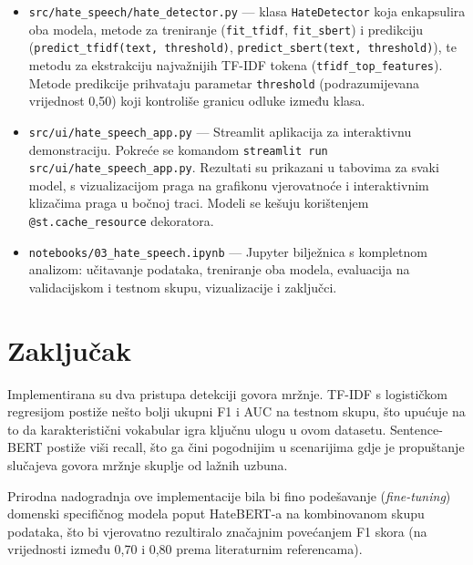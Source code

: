 \begin{itemize}
    \item \texttt{src/hate\_speech/hate\_detector.py} --- klasa \texttt{HateDetector} koja enkapsulira oba modela, metode za treniranje (\texttt{fit\_tfidf}, \texttt{fit\_sbert}) i predikciju (\texttt{predict\_tfidf(text, threshold)}, \texttt{predict\_sbert(text, threshold)}), te metodu za ekstrakciju najvažnijih TF-IDF tokena (\texttt{tfidf\_top\_features}). Metode predikcije prihvataju parametar \texttt{threshold} (podrazumijevana vrijednost 0,50) koji kontroliše granicu odluke između klasa.
    \item \texttt{src/ui/hate\_speech\_app.py} --- Streamlit aplikacija za interaktivnu demonstraciju. Pokreće se komandom \texttt{streamlit run src/ui/hate\_speech\_app.py}. Rezultati su prikazani u tabovima za svaki model, s vizualizacijom praga na grafikonu vjerovatnoće i interaktivnim klizačima praga u bočnoj traci. Modeli se kešuju korištenjem \texttt{@st.cache\_resource} dekoratora.
    \item \texttt{notebooks/03\_hate\_speech.ipynb} --- Jupyter bilježnica s kompletnom analizom: učitavanje podataka, treniranje oba modela, evaluacija na validacijskom i testnom skupu, vizualizacije i zaključci.
\end{itemize}

\section{Zaključak}

Implementirana su dva pristupa detekciji govora mržnje. TF-IDF s logističkom regresijom postiže nešto bolji ukupni F1 i AUC na testnom skupu, što upućuje na to da karakteristični vokabular igra ključnu ulogu u ovom datasetu. Sentence-BERT postiže viši recall, što ga čini pogodnijim u scenarijima gdje je propuštanje slučajeva govora mržnje skuplje od lažnih uzbuna.

Prirodna nadogradnja ove implementacije bila bi fino podešavanje (\textit{fine-tuning}) domenski specifičnog modela poput HateBERT-a \cite{caselli2020hatebert} na kombinovanom skupu podataka, što bi vjerovatno rezultiralo značajnim povećanjem F1 skora (na vrijednosti između 0,70 i 0,80 prema literaturnim referencama).

